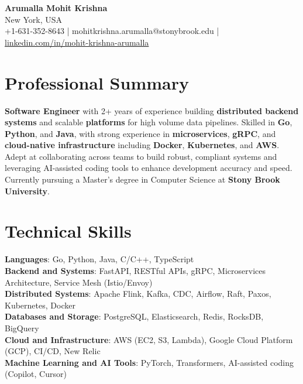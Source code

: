 \documentclass[letterpaper,11pt]{article}
\begin{document}
\begin{center}
  {\Large \textbf{Arumalla Mohit Krishna}} \\
  New York, USA \\
  +1-631-352-8643 \enspace | \enspace mohitkrishna.arumalla@stonybrook.edu \enspace | \enspace \href{https://www.linkedin.com/in/mohit-krishna-arumalla}{linkedin.com/in/mohit-krishna-arumalla}
\end{center}

\section{Professional Summary}
  \begin{itemize}[leftmargin=0.15in, label={}]
    \small{\item{
     \textbf{Software Engineer} with 2+ years of experience building \textbf{distributed backend systems} and scalable \textbf{platforms} for high volume data pipelines. Skilled in \textbf{Go}, \textbf{Python}, and \textbf{Java}, with strong experience in \textbf{microservices}, \textbf{gRPC}, and \textbf{cloud-native infrastructure} including \textbf{Docker}, \textbf{Kubernetes}, and \textbf{AWS}. Adept at collaborating across teams to build robust, compliant systems and leveraging AI-assisted coding tools to enhance development accuracy and speed. Currently pursuing a Master’s degree in Computer Science at \textbf{Stony Brook University}.
    }}
  \end{itemize}
\vspace{-16pt}

\section{Technical Skills}
 \begin{itemize}[leftmargin=0.15in, label={}]
    \small{\item{
     \textbf{Languages}: Go, Python, Java, C/C++, TypeScript \\
     \textbf{Backend and Systems}: FastAPI, RESTful APIs, gRPC, Microservices Architecture, Service Mesh (Istio/Envoy) \\
     \textbf{Distributed Systems}: Apache Flink, Kafka, CDC, Airflow, Raft, Paxos, Kubernetes, Docker \\
     \textbf{Databases and Storage}: PostgreSQL, Elasticsearch, Redis, RocksDB, BigQuery \\
     \textbf{Cloud and Infrastructure}: AWS (EC2, S3, Lambda), Google Cloud Platform (GCP), CI/CD, New Relic \\
     \textbf{Machine Learning and AI Tools}: PyTorch, Transformers, AI-assisted coding (Copilot, Cursor) \\
    }}
 \end{itemize}
\vspace{-16pt}
\end{document}
